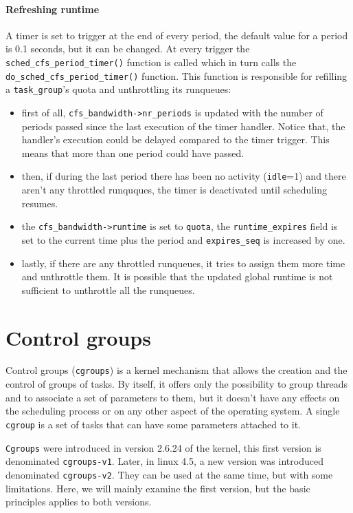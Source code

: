 \paragraph{Refreshing runtime}
A timer is set to trigger at the end of every period, the default value for a period is 0.1 seconds, but it can be changed. At every trigger the \verb|sched_cfs_period_timer()| function is called which in turn calls the \verb|do_sched_cfs_period_timer()| function. This function is responsible for refilling a \verb|task_group|'s quota and unthrottling its runqueues:
\begin{itemize}
    \item first of all, \verb|cfs_bandwidth->nr_periods| is updated with the number of periods passed since the last execution of the timer handler. Notice that, the handler's execution could be delayed compared to the timer trigger. This means that more than one period could have passed.
    \item then, if during the last period there has been no activity (\verb|idle|=1) and there aren't any throttled runquques, the timer is deactivated until scheduling resumes. %
    \item the \verb|cfs_bandwidth->runtime| is set to \verb|quota|, the \verb|runtime_expires| field is set to the current time plus the period and \verb|expires_seq| is increased by one.
    \item lastly, if there are any throttled runqueues, it tries to assign them more time and unthrottle them. It is possible that the updated global runtime is not sufficient to unthrottle all the runqueues.
\end{itemize}

\section{Control groups}
\label{sec:cgroup}

Control groups (\verb|cgroups|) is a kernel mechanism that allows the creation and the control of groups of tasks. By itself, it offers only the possibility to group threads and to associate a set of parameters to them, but it doesn't have any effects on the scheduling process or on any other aspect of the operating system. A single \verb|cgroup| is a set of tasks that can have some parameters attached to it. 

\verb|Cgroups| were introduced in version 2.6.24 of the kernel, this first version is denominated \verb|cgroups-v1|. Later, in linux 4.5, a new version was introduced denominated \verb|cgroups-v2|. They can be used at the same time, but with some limitations. Here, we will mainly examine the first version, but the basic principles applies to both versions.

